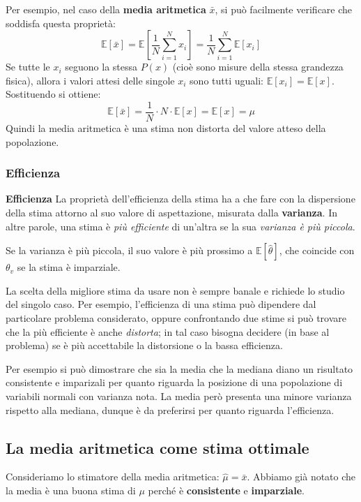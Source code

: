 \documentclass[openany,a4paper,12pt]{book}
\theoremstyle{remark}
\begin{document}
Per esempio, nel caso della \textbf{media aritmetica} $\bar{x}$, si può facilmente verificare che soddisfa questa proprietà:
\begin{equation}
\mathbb{E}[\bar{x}] = \mathbb{E}\left[ \frac{1}{N} \sum_{i=1}^N x_i \right] = \frac{1}{N} \sum_{i=1}^N \mathbb{E}[x_i]
\end{equation}
Se tutte le $x_i$ seguono la stessa $P(x)$ (cioè sono misure della stessa grandezza fisica), allora i valori attesi delle singole $x_i$ sono tutti uguali: $\mathbb{E}[x_i] = \mathbb{E}[x]$. Sostituendo si ottiene:
\begin{equation*}
\mathbb{E}[\bar{x}] = \frac{1}{N} \cdot N \cdot \mathbb{E}[x] = \mathbb{E}[x] = \mu
\end{equation*}
Quindi la media aritmetica è una stima non distorta del valore atteso della popolazione.

\subsubsection*{Efficienza}
\begin{definizione} \textbf{Efficienza} 
La proprietà dell'efficienza della stima ha a che fare con la dispersione della stima attorno al suo valore di aspettazione, misurata dalla \textbf{varianza}. In altre parole, una stima è \emph{più efficiente} di un'altra se la sua \emph{varianza è più piccola}.
\end{definizione}

Se la varianza è più piccola, il suo valore è più prossimo a $\mathbb{E}[\hat{\theta}]$, che coincide con $\theta_v$ se la stima è imparziale.

La scelta della migliore stima da usare non è sempre banale e richiede lo studio del singolo caso. Per esempio, l'efficienza di una stima può dipendere dal particolare problema considerato, oppure confrontando due stime si può trovare che la più efficiente è anche \emph{distorta}; in tal caso bisogna decidere (in base al problema) se è più accettabile la distorsione o la bassa efficienza.

Per esempio si può dimostrare che sia la media che la mediana diano un risultato consistente e imparizali per quanto riguarda la posizione di una popolazione di variabili normali con varianza nota. La media però presenta una minore varianza rispetto alla mediana, dunque è da preferirsi per quanto riguarda l'efficienza.
\subsection*{La media aritmetica come stima ottimale}
Consideriamo lo stimatore della media aritmetica: $\hat{\mu} = \bar{x}$.
Abbiamo già notato che la media è una buona stima di $\mu$ perché è \textbf{consistente} e \textbf{imparziale}.
\end{document}
